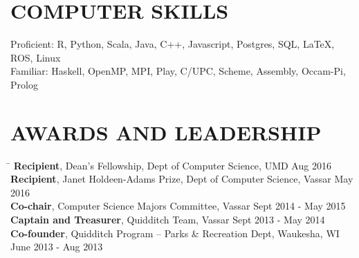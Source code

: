 \documentclass{res}
\begin{document}
\begin{resume}
{  \vspace{-1pt}
  \section{\hspace{0.2in}COMPUTER SKILLS}
    \vspace{3pt}
      Proficient: R, Python, Scala, Java, C++, Javascript, Postgres, SQL, LaTeX, ROS, Linux\\
      Familiar: Haskell, OpenMP, MPI, Play, C/UPC, Scheme, Assembly, Occam-Pi, Prolog\\

  \vspace{-16pt}
  \section{\hspace{0.2in}AWARDS AND LEADERSHIP}
    \vspace{-3pt}
    \begin{tabbing}
      \hspace{5.65in}\=  \kill %
      {\bf Recipient}, Dean's Fellowship, Dept of Computer Science, UMD\>
          Aug 2016\\
      {\bf Recipient}, Janet Holdeen-Adams Prize, Dept of Computer Science, Vassar\>
          May 2016\\
      {\bf Co-chair}, Computer Science Majors Committee, Vassar\>
          Sept 2014 - May 2015\\
      {\bf Captain and Treasurer}, Quidditch Team, Vassar\>
          Sept 2013 - May 2014\\
      {\bf Co-founder}, Quidditch Program -- Parks \& Recreation Dept, Waukesha, WI\>
           June 2013 - Aug 2013\\
    \end{tabbing}
} %
\end{resume}
\end{document}
